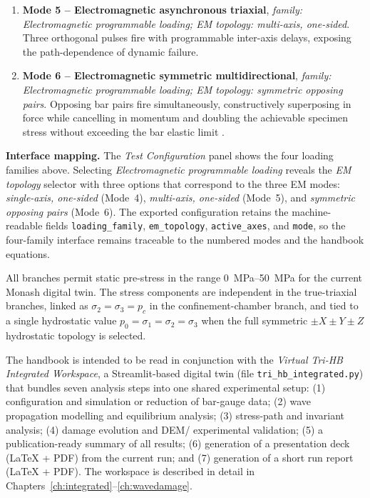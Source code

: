 \documentclass[11pt,a4paper,openany]{book}
\providecommand{\SIrange}[3]{\qtyrange{#1}{#2}{#3}}
\theoremstyle{handbook}
\newcommand{\sig}{\sigma}
\begin{document}
\begin{enumerate}[leftmargin=2.4em,itemsep=4pt]
{      Electromagnetic programmable loading; EM topology: single-axis,
      one-sided}. A capacitor-bank-driven coil generates a clean half-sine
      pulse on a single bar, with independently tunable amplitude and
      duration.
\item \textbf{Mode 5 -- Electromagnetic asynchronous triaxial}, \emph{family:
      Electromagnetic programmable loading; EM topology: multi-axis,
      one-sided}. Three orthogonal pulses fire with programmable inter-axis
      delays, exposing the path-dependence of dynamic failure.
\item \textbf{Mode 6 -- Electromagnetic symmetric multidirectional},
      \emph{family: Electromagnetic programmable loading; EM topology:
      symmetric opposing pairs}. Opposing bar pairs fire simultaneously,
      constructively superposing in force while cancelling in momentum and
      doubling the achievable specimen stress without exceeding the bar
      elastic limit \cite{xie2021}.
\end{enumerate}

\noindent\textbf{Interface mapping.} The \emph{Test Configuration} panel shows
the four loading families above. Selecting \emph{Electromagnetic programmable
loading} reveals the \emph{EM topology} selector with three options that
correspond to the three EM modes:
\emph{single-axis, one-sided} (Mode~4), \emph{multi-axis, one-sided}
(Mode~5), and \emph{symmetric opposing pairs} (Mode~6). The exported
configuration retains the machine-readable fields
\texttt{loading\_family}, \texttt{em\_topology}, \texttt{active\_axes}, and
\texttt{mode}, so the four-family interface remains traceable to the
numbered modes and the handbook equations.

\noindent All branches permit static pre-stress in the range
\SIrange{0}{50}{MPa} for the current Monash digital twin.  The stress
components are independent in the true-triaxial branches, linked as
$\sig_2=\sig_3=p_c$ in the confinement-chamber branch, and tied to a
single hydrostatic value $p_0=\sig_1=\sig_2=\sig_3$ when the full
symmetric $\pm X\pm Y\pm Z$ hydrostatic topology is selected.

The handbook is intended to be read in conjunction with the
\emph{Virtual Tri-HB Integrated Workspace}, a Streamlit-based digital twin
(file \texttt{tri\_hb\_integrated.py}) that bundles seven analysis steps into
one shared experimental setup: (1) configuration and simulation or reduction
of bar-gauge data; (2) wave propagation modelling and equilibrium analysis;
(3) stress-path and invariant analysis; (4) damage evolution and DEM/
experimental validation; (5) a publication-ready summary of all results;
(6) generation of a presentation deck (LaTeX + PDF) from the current run; and
(7) generation of a short run report (LaTeX + PDF). The workspace is described
in detail in Chapters~\ref{ch:integrated}--\ref{ch:wavedamage}.
\end{document}
